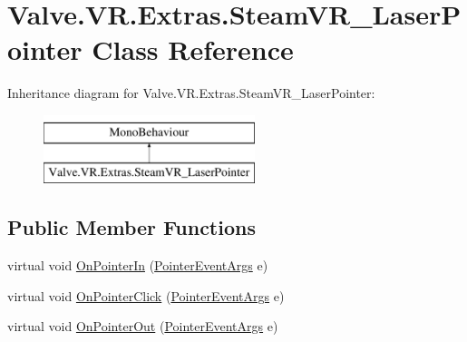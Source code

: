 \hypertarget{class_valve_1_1_v_r_1_1_extras_1_1_steam_v_r___laser_pointer}{}\section{Valve.\+V\+R.\+Extras.\+Steam\+V\+R\+\_\+\+Laser\+Pointer Class Reference}
\label{class_valve_1_1_v_r_1_1_extras_1_1_steam_v_r___laser_pointer}
Inheritance diagram for Valve.\+V\+R.\+Extras.\+Steam\+V\+R\+\_\+\+Laser\+Pointer\+:\begin{figure}[H]
\begin{center}
\leavevmode
\includegraphics[height=2.000000cm]{class_valve_1_1_v_r_1_1_extras_1_1_steam_v_r___laser_pointer}
\end{center}
\end{figure}
\subsection*{Public Member Functions}
\begin{DoxyCompactItemize}
\item 
virtual void \mbox{\hyperlink{class_valve_1_1_v_r_1_1_extras_1_1_steam_v_r___laser_pointer_a8abd270e291a20d2cf158414037f58a7}{On\+Pointer\+In}} (\mbox{\hyperlink{struct_valve_1_1_v_r_1_1_extras_1_1_pointer_event_args}{Pointer\+Event\+Args}} e)
\item 
virtual void \mbox{\hyperlink{class_valve_1_1_v_r_1_1_extras_1_1_steam_v_r___laser_pointer_afdc40213b641f4aca89be86dd0e72b2c}{On\+Pointer\+Click}} (\mbox{\hyperlink{struct_valve_1_1_v_r_1_1_extras_1_1_pointer_event_args}{Pointer\+Event\+Args}} e)
\item 
virtual void \mbox{\hyperlink{class_valve_1_1_v_r_1_1_extras_1_1_steam_v_r___laser_pointer_ae93c110e9f0c48ce7441ce806cb340d7}{On\+Pointer\+Out}} (\mbox{\hyperlink{struct_valve_1_1_v_r_1_1_extras_1_1_pointer_event_args}{Pointer\+Event\+Args}} e)
\end{DoxyCompactItemize}
